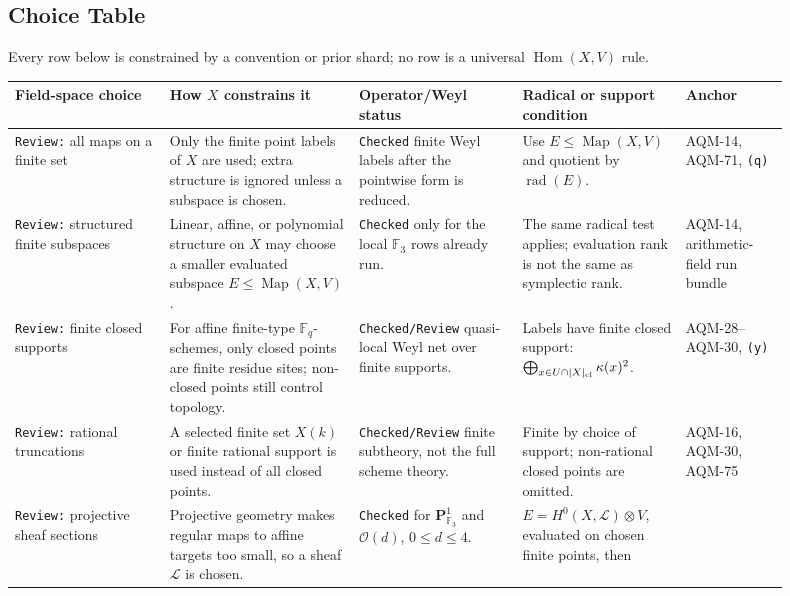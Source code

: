 \subsection{Choice Table}

Every row below is constrained by a convention or prior shard; no row is a universal \(\operatorname{Hom}(X,V)\) rule.
\begin{center}
\small\setlength{\tabcolsep}{3pt}
\begin{tabular}{p{0.18\linewidth}p{0.22\linewidth}p{0.19\linewidth}p{0.19\linewidth}p{0.12\linewidth}}
\toprule
Field-space choice & How \(X\) constrains it & Operator/Weyl status &
Radical or support condition & Anchor \\
\midrule
\texttt{Review:} all maps on a finite set &
Only the finite point labels of \(X\) are used; extra structure is ignored
unless a subspace is chosen. &
\texttt{Checked} finite Weyl labels after the pointwise form is reduced. &
Use \(E\leq\operatorname{Map}(X,V)\) and quotient by
\(\operatorname{rad}(E)\). &
AQM-14, AQM-71, \texttt{(q)} \\
\addlinespace
\texttt{Review:} structured finite subspaces &
Linear, affine, or polynomial structure on \(X\) may choose a smaller
evaluated subspace \(E\leq\operatorname{Map}(X,V)\). &
\texttt{Checked} only for the local \(\mathbb F_3\) rows already run. &
The same radical test applies; evaluation rank is not the same as symplectic
rank. &
AQM-14, arithmetic-field run bundle \\
\addlinespace
\texttt{Review:} finite closed supports &
For affine finite-type \(\mathbb F_q\)-schemes, only closed points are finite
residue sites; non-closed points still control topology. &
\texttt{Checked/Review} quasi-local Weyl net over finite supports. &
Labels have finite closed support:
\(\bigoplus_{x\in U\cap |X|_{\rm cl}}\kappa(x)^2\). &
AQM-28--AQM-30, \texttt{(y)} \\
\addlinespace
\texttt{Review:} rational truncations &
A selected finite set \(X(k)\) or finite rational support is used instead of
all closed points. &
\texttt{Checked/Review} finite subtheory, not the full scheme theory. &
Finite by choice of support; non-rational closed points are omitted. &
AQM-16, AQM-30, AQM-75 \\
\addlinespace
\texttt{Review:} projective sheaf sections &
Projective geometry makes regular maps to affine targets too small, so a
sheaf \(\mathcal L\) is chosen. &
\texttt{Checked} for \(\mathbf P^1_{\mathbb F_3}\) and
\(\mathcal O(d)\), \(0\leq d\leq4\). &
\(E=H^0(X,\mathcal L)\otimes V\), evaluated on chosen finite points, then

\end{tabular}
\end{center}
